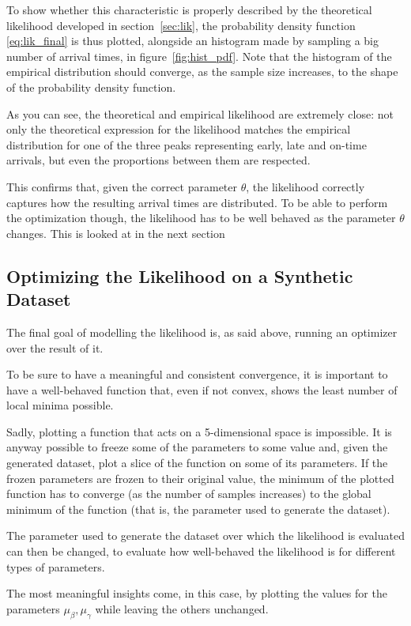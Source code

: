 To show whether this characteristic is properly described by the theoretical likelihood developed in section~\ref{sec:lik},
the probability density function \eqref{eq:lik_final} is thus plotted,
alongside an histogram made by sampling a big number of arrival times,
in figure~\ref{fig:hist_pdf}.
Note that the histogram of the empirical distribution should converge,
as the sample size increases, to the shape of the probability density function.


As you can see, the theoretical and empirical likelihood are extremely close:
not only the theoretical expression for the likelihood matches the empirical distribution for one of the three peaks representing early, late and on-time arrivals,
but even the proportions between them are respected.

This confirms that, given the correct parameter \(\theta\),
the likelihood correctly captures how the resulting arrival times are distributed.
To be able to perform the optimization though,
the likelihood has to be well behaved as the parameter \(\theta\) changes.
This is looked at in the next section

\subsection{Optimizing the Likelihood on a Synthetic Dataset}

The final goal of modelling the likelihood is, as said above,
running an optimizer over the result of it.

To be sure to have a meaningful and consistent convergence,
it is important to have a well-behaved function that,
even if not convex, shows the least number of local minima possible.

Sadly, plotting a function that acts on a 5-dimensional space is impossible.
It is anyway possible to freeze some of the parameters to some value and,
given the generated dataset, plot a slice of the function on some of its parameters.
If the frozen parameters are frozen to their original value,
the minimum of the plotted function has to converge (as the number of samples increases)
to the global minimum of the function (that is, the parameter used to generate the dataset).

The parameter used to generate the dataset over which the likelihood is evaluated can then be changed,
to evaluate how well-behaved the likelihood is for different types of parameters.

The most meaningful insights come, in this case, by plotting the values for the parameters \(\mu_\beta, \mu_\gamma\) while leaving the others unchanged.

